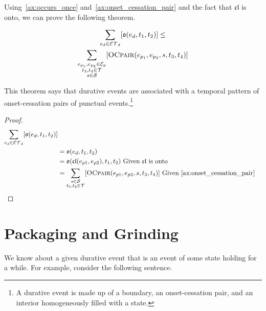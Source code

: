 Using~\ref{ax:occurs_once} and~\ref{ax:onset_cessation_pair} and the fact that $\mathfrak{cl}$ is onto, we can prove the following theorem.

\begin{theorem}\label{thm:durative_events_temporal_pattern}
	\begin{equation}
		\begin{gathered}
			\sum_{e_d \in \mathcal{ET}_d}[\mathfrak{o}(e_d, t_1, t_2)] \leq  \\
			\sum_{\substack{e_{p_1}, e_{p_2} \in \mathcal{E}_p \\ t_3, t_4 \in \mathcal{T} \\ s \in \mathcal{S}}}[
				\textsc{OCpair}(e_{p_1}, e_{p_2}, s, t_3, t_4)
			]
		\end{gathered}
	\end{equation}
\end{theorem}

This theorem says that durative events are associated with a temporal pattern of onset-cessation pairs of punctual events.\footnote{A durative event is
	made up of a boundary, an onset-cessation pair, and an interior homogeneously filled with a state.}

\begin{proof}
	\begin{align*}
		\sum_{e_d \in \mathcal{ET}_d}[\mathfrak{o}(e_d, t_1, t_2)]                                                 \\
		 & = \mathfrak{o}(e_d, t_1, t_2)                                                                           \\
		 & = \mathfrak{o}(\mathfrak{cl}(e_{p1}, e_{p2}), t_1, t_2) \ \text{Given} \ \mathfrak{cl} \ \text{is onto} \\
		 & = \sum_{\substack{s \in \mathcal{S}                                                                     \\ t_3, t_4 \in \mathcal{T}}}[\textsc{OCpair}(e_{p1}, e_{p2}, s, t_3, t_4)] \ \text{Given~\ref{ax:onset_cessation_pair}}
	\end{align*}
\end{proof}

\section{Packaging and Grinding}
We know about a given durative event that is an event of some state holding for a while. For example, consider the following sentence.

